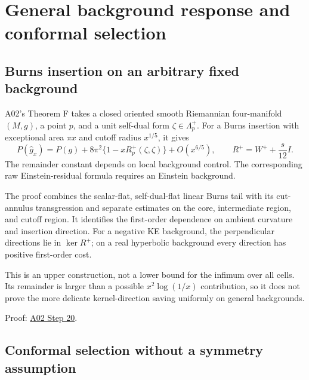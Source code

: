 \documentclass[
]{article}
\begin{document}
\hypertarget{general-background-response-and-conformal-selection}{%
\section{General background response and conformal
selection}\label{general-background-response-and-conformal-selection}}

\hypertarget{burns-insertion-on-an-arbitrary-fixed-background}{%
\subsection{Burns insertion on an arbitrary fixed
background}\label{burns-insertion-on-an-arbitrary-fixed-background}}

A02's Theorem F takes a closed oriented smooth Riemannian four-manifold
\((M,g)\), a point \(p\), and a unit self-dual form
\(\zeta\in\Lambda_p^+\). For a Burns insertion with exceptional area
\(\pi x\) and cutoff radius \(x^{1/5}\), it gives \[
 P(\widehat g_x)=P(g)+8\pi^2\{1-xR_p^+(\zeta,\zeta)\}+O(x^{6/5}),
 \qquad R^+=W^++\frac{s}{12}I.
\] The remainder constant depends on local background control. The
corresponding raw Einstein-residual formula requires an Einstein
background.

The proof combines the scalar-flat, self-dual-flat linear Burns tail
with its cut-annulus transgression and separate estimates on the core,
intermediate region, and cutoff region. It identifies the first-order
dependence on ambient curvature and insertion direction. For a negative
KE background, the perpendicular directions lie in \(\ker R^+\); on a
real hyperbolic background every direction has positive first-order
cost.

This is an upper construction, not a lower bound for the infimum over
all cells. Its remainder is larger than a possible \(x^2\log(1/x)\)
contribution, so it does not prove the more delicate kernel-direction
saving uniformly on general backgrounds.

Proof:
\href{sources/Sessions/S1003A02/workspace/notes/step20_burns_response_and_neck_quantization.md}{A02
Step 20}.

\hypertarget{conformal-selection-without-a-symmetry-assumption}{%
\subsection{Conformal selection without a symmetry
assumption}\label{conformal-selection-without-a-symmetry-assumption}}
\end{document}
